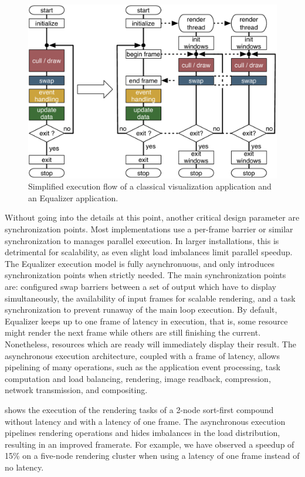 \begin{figure}[ht]\center
 \includegraphics[width=.9\columnwidth]{images/executionFlow}
 \caption{Simplified execution flow of a classical visualization application
  and an Equalizer application.}
 \label{FIG_execution}
\end{figure}

Without going into the details at this point, another critical design parameter
are synchronization points. Most implementations use a per-frame barrier or
similar synchronization to manages parallel execution. In larger installations,
this is detrimental for scalability, as even slight load imbalances limit
parallel speedup. The Equalizer execution model is fully asynchronuous, and only
introduces synchronization points when strictly needed. The main synchronization
points are: configured swap barriers between a set of output which have to
display simultaneously, the availability of input frames for scalable rendering,
and a task synchronization to prevent runaway of the main loop execution. By
default, Equalizer keeps up to one frame of latency in execution, that is, some
resource might render the next frame while others are still finishing the
current. Nonetheless, resources which are ready will immediately display their
result. The asynchronous execution architecture, coupled with a frame of
latency, allows pipelining of many operations, such as the application event
processing, task computation and load balancing, rendering, image readback,
compression, network transmission, and compositing.

 shows the execution of the rendering tasks of a 2-node
sort-first compound without latency and with a latency of one frame. The
asynchronous execution pipelines rendering operations and hides imbalances in
the load distribution, resulting in an improved framerate. For example, we have
observed a speedup of 15\% on a five-node rendering cluster when using a latency
of one frame instead of no latency.


